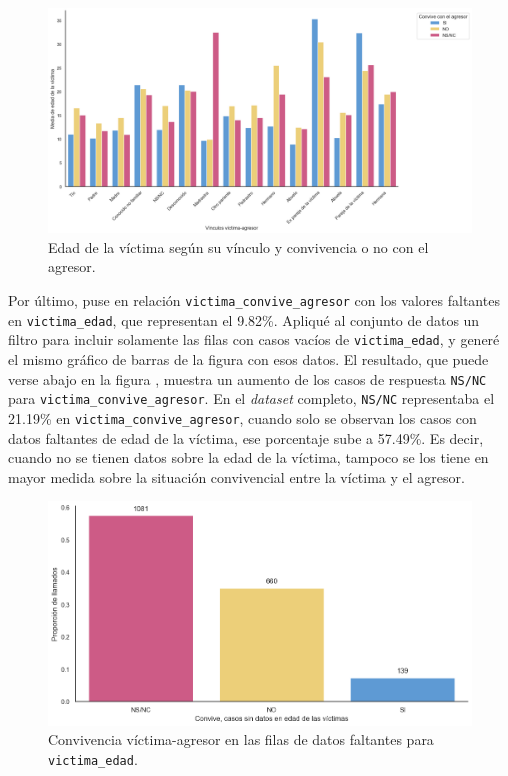 \documentclass[10 pt]{article}
\begin{document}
\begin{figure}[H]
    \begin{center}
    \includegraphics[scale=.4]{images/convive_edad_agresor.png}
    \caption{Edad de la víctima según su vínculo y convivencia o no con el agresor.}
    \label{edadconvagr}
    \end{center}
    \end{figure}


Por último, puse en relación \texttt{victima\_convive\_agresor} con los valores faltantes en \texttt{victima\_edad}, que representan el 9.82\%. Apliqué al conjunto de datos un filtro para incluir solamente las filas con casos vacíos de \texttt{victima\_edad}, y generé el mismo gráfico de barras de la figura  con esos datos. El resultado, que puede verse abajo en la figura , muestra un aumento de los casos de respuesta \texttt{NS/NC} para \texttt{victima\_convive\_agresor}. En el \textit{dataset} completo, \texttt{NS/NC} representaba el 21.19\% en \texttt{victima\_convive\_agresor}, cuando solo se observan los casos con datos faltantes de edad de la víctima, ese porcentaje sube a 57.49\%. Es decir, cuando no se tienen datos sobre la edad de la víctima, tampoco se los tiene en mayor medida sobre la situación convivencial entre la víctima y el agresor.

\begin{figure}[H]
    \begin{center}
    \includegraphics[scale=.4]{images/latex_convive_sd_edad_vic.png}
    \caption{Convivencia víctima-agresor en las filas de datos faltantes para \texttt{victima\_edad}.}
    \label{conviveedadfaltantevic}
    \end{center}
    \end{figure}
  
\end{document}
